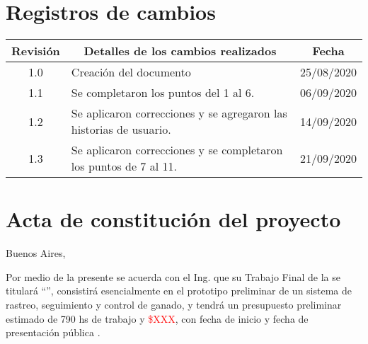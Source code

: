 \documentclass[11pt]{charter}
\begin{document}
\maketitle
\thispagestyle{empty}
\pagebreak


\thispagestyle{empty}
{\setlength{\parskip}{0pt}
\tableofcontents{}
}
\pagebreak


\section{Registros de cambios}
\label{sec:registro}


\begin{table}[ht]
\label{tab:registro}
\centering
\begin{tabularx}{\linewidth}{@{}|c|X|c|@{}}
\hline
\rowcolor[HTML]{C0C0C0} 
Revisión & \multicolumn{1}{c|}{\cellcolor[HTML]{C0C0C0}Detalles de los cambios realizados} & Fecha      \\ \hline
1.0      & Creación del documento                                          & 25/08/2020 \\ \hline
1.1      & Se completaron los puntos del 1 al 6.                                                                 & 06/09/2020 \\ \hline
1.2      & Se aplicaron correcciones y se agregaron las historias de usuario. & 14/09/2020 \\ \hline
1.3      & Se aplicaron correcciones y se completaron los puntos de 7 al 11.                                                 & 21/09/2020 \\ \hline
\end{tabularx}
\end{table}

\pagebreak



\section{Acta de constitución del proyecto}
\label{sec:acta}

\begin{flushright}
Buenos Aires, \fechaInicioName
\end{flushright}

\vspace{2cm}

Por medio de la presente se acuerda con el Ing. \authorname\hspace{1px} que su Trabajo Final de la \degreename\hspace{1px} se titulará ``\ttitle'', consistirá esencialmente en el prototipo preliminar de un sistema de rastreo, seguimiento y control de ganado, y tendrá un presupuesto preliminar estimado de 790 hs de trabajo y \textcolor{red}{\$XXX}, con fecha de inicio \fechaInicioName\hspace{1px} y fecha de presentación pública \fechaFinalName.
\end{document}
